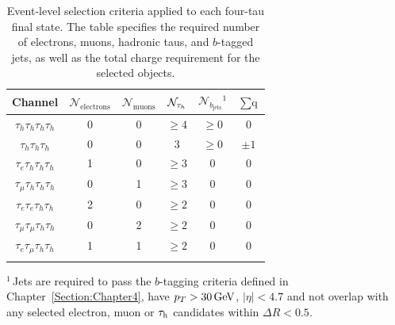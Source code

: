{
\setlength{\arrayrulewidth}{1pt}

\begin{table}[!htbp]
\caption[Event-level selection requirements applied to each four-tau final state.]{
Event-level selection criteria applied to each four-tau final state. The table specifies the required number of electrons, muons, hadronic taus, and $b$-tagged jets, as well as the total charge requirement for the selected objects.}
\label{Table:Chapter6_Event_Channel_Selections}
\centering
\renewcommand{\arraystretch}{1.5}
\setlength{\tabcolsep}{12pt}

\begin{tabular}{cccccc}
\hline
Channel & $\mathcal{N}_\text{electrons}$ & $\mathcal{N}_\text{muons}$ & $\mathcal{N}_{\tau_h}$ & $\mathcal{N}_{b_\text{jets}}$\hyperlink{b-jet_selections}{$^1$} & $\sum\text{q}$\\
\hline

$\tau_h\tau_h\tau_h\tau_h$ &  0 & 0 & $\geq 4$ & $\geq 0$ & 0\\
\arrayrulecolor{lightgray} \hline

$\tau_h\tau_h\tau_h$ & 0 & 0 & 3 & $\geq 0$ & $\pm 1$\\
\arrayrulecolor{lightgray} \hline

$\tau_e\tau_h\tau_h\tau_h$ & 1 & 0 & $\geq3$ & $0$  & 0 \\
\arrayrulecolor{lightgray} \hline

$\tau_\mu\tau_h\tau_h\tau_h$ & 0 & 1 & $\geq 3$ & $0$ & 0 \\
\arrayrulecolor{lightgray} \hline

$\tau_e\tau_e\tau_h\tau_h$ & 2 & 0 & $\geq 2$ & $0$ & 0\\
\arrayrulecolor{lightgray} \hline

$\tau_\mu\tau_\mu\tau_h\tau_h$ & 0 & 2 & $\geq 2$ & $0$ & 0 \\
\arrayrulecolor{lightgray} \hline

$\tau_e\tau_\mu\tau_h\tau_h$ & 1 & 1 & $\geq 2$ & $0$ & 0 \\
\arrayrulecolor{black} \hline
\end{tabular}
\vspace{0.5em}
\begin{minipage}{0.95\linewidth}
\raggedright
\footnotesize\hypertarget{b-jet_selections}{}$^{1}$\,Jets are required to pass the $b$-tagging criteria defined in Chapter~\ref{Section:Chapter4}, have $p_T > 30\,\text{Ge\hspace{-.08em}V}$, $|\eta| < 4.7$ and not overlap with any selected electron, muon or $\tau_\mathrm{h}$ candidates within $\Delta R < 0.5$.
\end{minipage}
\end{table}
}


